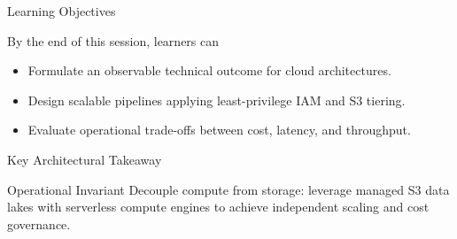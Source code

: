\documentclass[aspectratio=169,10pt]{beamer}
\author{upGrad Enterprise Cloud Faculty}
\date{}
\begin{document}

\begin{frame}{Learning Objectives}
  \begin{LearningObjectives}{By the end of this session, learners can}
    \begin{itemize}
      \item Formulate an observable technical outcome for cloud architectures.
      \item Design scalable pipelines applying least-privilege IAM and S3 tiering.
      \item Evaluate operational trade-offs between cost, latency, and throughput.
    \end{itemize}
  \end{LearningObjectives}
\end{frame}

\begin{frame}{Key Architectural Takeaway}
  \begin{TakeawayBox}{Operational Invariant}
    Decouple compute from storage: leverage managed S3 data lakes with serverless compute engines to achieve independent scaling and cost governance.
  \end{TakeawayBox}
\end{frame}
\end{document}
